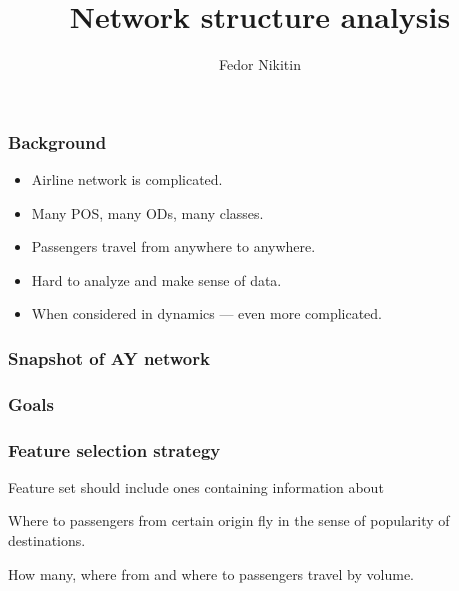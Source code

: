 \documentclass{beamer}
\title{Network structure analysis}
\author{Fedor Nikitin}
\begin{document}
  \maketitle
  \begin{frame}
    \frametitle{Background}
    \begin{itemize}
      \item Airline network is complicated.
      \item Many POS, many ODs, many classes.
      \item Passengers travel from anywhere to anywhere.
      \item Hard to analyze and make sense of data.
      \item When considered in dynamics --- even more complicated.
    \end{itemize}
  \end{frame}

  \begin{frame}
    \frametitle{Snapshot of AY network}
  \end{frame}

  \begin{frame}
    \frametitle{Goals}
  \end{frame}

  \begin{frame}
    \frametitle{}
  \end{frame}

  \begin{frame}
    \frametitle{Feature selection strategy}
    Feature set should include ones containing information about

    \vspace{10pt} 

    Where to passengers from certain origin fly in the sense of popularity
    of destinations.
    
    \vspace{10pt} 

    How many, where from and where to passengers travel by volume. 

     \vspace{10pt}
  \end{frame}
\end{document}

